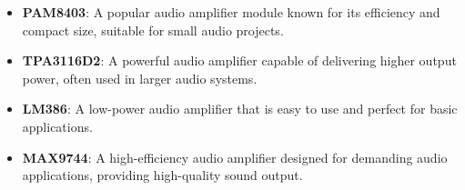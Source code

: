 \begin{itemize}
	\item \textbf{PAM8403}: A popular audio amplifier module known for its efficiency and compact size, suitable for small audio projects.
	
	
	\item \textbf{TPA3116D2}: A powerful audio amplifier capable of delivering higher output power, often used in larger audio systems.
	
	
	
	\item \textbf{LM386}: A low-power audio amplifier that is easy to use and perfect for basic applications.
	
	
	\item \textbf{MAX9744}: A high-efficiency audio amplifier designed for demanding audio applications, providing high-quality sound output.
	
	
\end{itemize}
